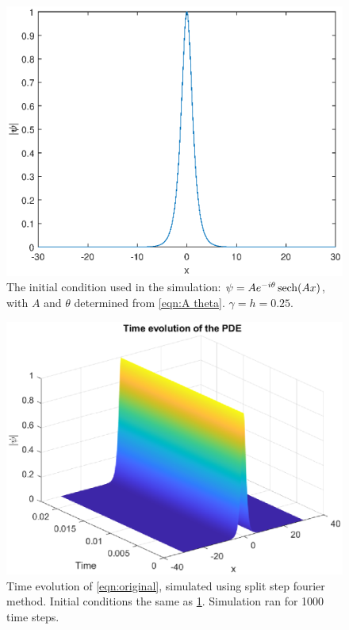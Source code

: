 \documentclass[11pt]{article}
\numberwithin{equation}{section}
\numberwithin{figure}{section}
\numberwithin{table}{section}
\begin{document}
\begin{figure}[h]
    \begin{center}   
        \includegraphics[scale=0.6]{Plots/initialCondition.eps}
        \caption{The initial condition used in the simulation: $\psi=Ae^{-i\theta}\sech(Ax)$, with $A$ and $\theta$ determined from \cref{eqn:A theta}. $\gamma=h=0.25$.}
        \label{fig:initialCondition}
    \end{center}
\end{figure}
\begin{figure}[h]
    \begin{center}
        \includegraphics[scale=0.6]{Plots/timeEvolution.eps}
        \caption{Time evolution of \cref{eqn:original}, simulated using split step fourier method. Initial conditions the same as \cref{fig:initialCondition}. Simulation ran for 1000 time steps.}
        \label{fig:timeEvolution}
    \end{center}
\end{figure}
\end{document}
